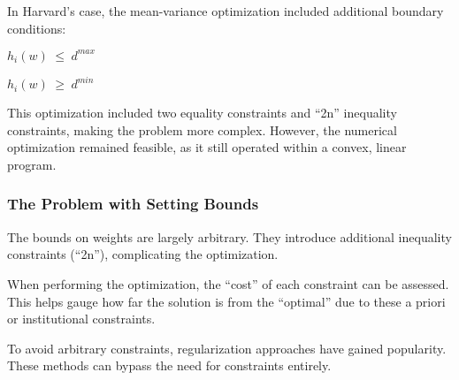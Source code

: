 \documentclass{article}
\begin{document}
In Harvard's case, the mean-variance optimization included additional
boundary conditions:

\(h_{i}(w)\hspace{3pt}{\leq}\hspace{3pt}d^{max}\)

\(h_{i}(w)\hspace{3pt}{\geq}\hspace{3pt}d^{min}\)

This optimization included two equality constraints and ``2n''
inequality constraints, making the problem more complex. However, the
numerical optimization remained feasible, as it still operated within a
convex, linear program.

\hypertarget{the-problem-with-setting-bounds}{%
\subsubsection{The Problem with Setting Bounds}\label{the-problem-with-setting-bounds}}

The bounds on weights are largely arbitrary. They introduce additional
inequality constraints (``2n''), complicating the optimization.

When performing the optimization, the ``cost'' of each constraint can be
assessed. This helps gauge how far the solution is from the ``optimal''
due to these a priori or institutional constraints.

To avoid arbitrary constraints, regularization approaches have gained
popularity. These methods can bypass the need for constraints entirely.
\end{document}
